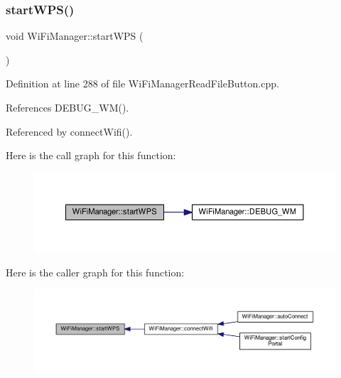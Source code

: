 \subsubsection{\texorpdfstring{start\+W\+P\+S()}{startWPS()}}
{\footnotesize\ttfamily void Wi\+Fi\+Manager\+::start\+W\+PS (\begin{DoxyParamCaption}{ }\end{DoxyParamCaption})\hspace{0.3cm}{\ttfamily [private]}}



Definition at line 288 of file Wi\+Fi\+Manager\+Read\+File\+Button.\+cpp.



References D\+E\+B\+U\+G\+\_\+\+W\+M().



Referenced by connect\+Wifi().

Here is the call graph for this function\+:
\nopagebreak
\begin{figure}[H]
\begin{center}
\leavevmode
\includegraphics[width=350pt]{d4/dc8/class_wi_fi_manager_abcc403fc26a47f7a111d1271f1d0869e_cgraph}
\end{center}
\end{figure}
Here is the caller graph for this function\+:
\nopagebreak
\begin{figure}[H]
\begin{center}
\leavevmode
\includegraphics[width=350pt]{d4/dc8/class_wi_fi_manager_abcc403fc26a47f7a111d1271f1d0869e_icgraph}
\end{center}
\end{figure}
\mbox{\label{class_wi_fi_manager_ae0ae27b5543b47585728c084c3bbdca7}} 
